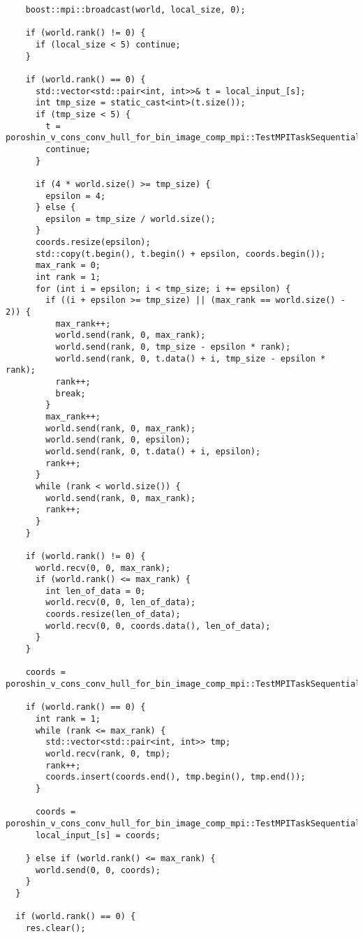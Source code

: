 \documentclass[12pt]{article}
\begin{document}
\begin{verbatim}
    boost::mpi::broadcast(world, local_size, 0);

    if (world.rank() != 0) {
      if (local_size < 5) continue;
    }

    if (world.rank() == 0) {
      std::vector<std::pair<int, int>>& t = local_input_[s];
      int tmp_size = static_cast<int>(t.size());
      if (tmp_size < 5) {
        t = poroshin_v_cons_conv_hull_for_bin_image_comp_mpi::TestMPITaskSequential::convex_hull(t);
        continue;
      }

      if (4 * world.size() >= tmp_size) {
        epsilon = 4;
      } else {
        epsilon = tmp_size / world.size();
      }
      coords.resize(epsilon);
      std::copy(t.begin(), t.begin() + epsilon, coords.begin());
      max_rank = 0;
      int rank = 1;
      for (int i = epsilon; i < tmp_size; i += epsilon) {
        if ((i + epsilon >= tmp_size) || (max_rank == world.size() - 2)) {
          max_rank++;
          world.send(rank, 0, max_rank);
          world.send(rank, 0, tmp_size - epsilon * rank);
          world.send(rank, 0, t.data() + i, tmp_size - epsilon * rank);
          rank++;
          break;
        }
        max_rank++;
        world.send(rank, 0, max_rank);
        world.send(rank, 0, epsilon);
        world.send(rank, 0, t.data() + i, epsilon);
        rank++;
      }
      while (rank < world.size()) {
        world.send(rank, 0, max_rank);
        rank++;
      }
    }

    if (world.rank() != 0) {
      world.recv(0, 0, max_rank);
      if (world.rank() <= max_rank) {
        int len_of_data = 0;
        world.recv(0, 0, len_of_data);
        coords.resize(len_of_data);
        world.recv(0, 0, coords.data(), len_of_data);
      }
    }

    coords = poroshin_v_cons_conv_hull_for_bin_image_comp_mpi::TestMPITaskSequential::convex_hull(coords);

    if (world.rank() == 0) {
      int rank = 1;
      while (rank <= max_rank) {
        std::vector<std::pair<int, int>> tmp;
        world.recv(rank, 0, tmp);
        rank++;
        coords.insert(coords.end(), tmp.begin(), tmp.end());
      }

      coords = poroshin_v_cons_conv_hull_for_bin_image_comp_mpi::TestMPITaskSequential::convex_hull(coords);
      local_input_[s] = coords;

    } else if (world.rank() <= max_rank) {
      world.send(0, 0, coords);
    }
  }

  if (world.rank() == 0) {
    res.clear();


\end{verbatim}
\end{document}

